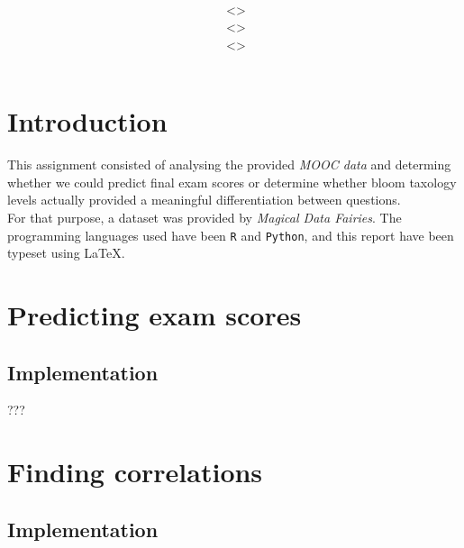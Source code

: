 \documentclass[12pt,a4paper]{article}
\title{\vspace{2in}\textmd{\hmwkClass\\\textbf{\hmwkTitle}}\\\normalsize\vspace{0.1in}\small{\hmwkDueDate}\\\vspace{4in}}
\date{}
\author{\textbf{\hmwkAuthorNameA} $\;$<\texttt{\href{mailto:laane2@illinois.edu}{\hmwkAuthorEmailA}}>\\\textbf{\hmwkAuthorNameB} $\;$<\texttt{\href{mailto:ruizcep2@illinois.edu}{\hmwkAuthorEmailB}}>\\\textbf{\hmwkAuthorNameC} $\;$<\texttt{\href{mailto:njeffre2@illinois.edu}{\hmwkAuthorEmailC}}>}
\begin{document}
\begin{singlespace}

\begin{titlepage}
\maketitle
\thispagestyle{empty}
\end{titlepage}

\tableofcontents
\newpage


\clearpage

\section{Introduction}
This assignment consisted of analysing the provided \emph{MOOC data} and determing whether we could predict final exam scores or determine whether bloom taxology levels actually provided a meaningful differentiation between questions. \\

For that purpose, a dataset was provided by \emph{Magical Data Fairies}. The programming languages used have been \texttt{R} and \texttt{Python}, and this report have been typeset using \LaTeX.

\section{Predicting exam scores}
\subsection{Implementation}
???

\section{Finding correlations}
\subsection{Implementation}


\newpage

\end{singlespace}
\end{document}
